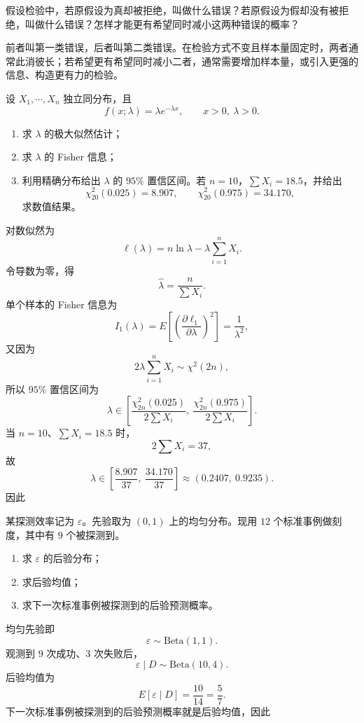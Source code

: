 ﻿

\begin{question}
假设检验中，若原假设为真却被拒绝，叫做什么错误？若原假设为假却没有被拒绝，叫做什么错误？怎样才能更有希望同时减小这两种错误的概率？
\begin{solution}
前者叫第一类错误，后者叫第二类错误。在检验方式不变且样本量固定时，两者通常此消彼长；若希望更有希望同时减小二者，通常需要增加样本量，或引入更强的信息、构造更有力的检验。
\end{solution}
\end{question}

\begin{question}
设 $X_1,\cdots,X_n$ 独立同分布，且
\[
f(x;\lambda)=\lambda e^{-\lambda x},\qquad x>0,\ \lambda>0.
\]
\begin{enumerate}
\item 求 $\lambda$ 的极大似然估计；
\item 求 $\lambda$ 的 Fisher 信息；
\item 利用精确分布给出 $\lambda$ 的 $95\%$ 置信区间。若 $n=10$，$\sum X_i=18.5$，并给出
\[
\chi^2_{20}(0.025)=8.907,\qquad \chi^2_{20}(0.975)=34.170,
\]
求数值结果。
\end{enumerate}
\begin{solution}
对数似然为
\[
\ell(\lambda)=n\ln\lambda-\lambda\sum_{i=1}^n X_i.
\]
令导数为零，得
\[
\hat\lambda=\frac{n}{\sum X_i}.
\]
单个样本的 Fisher 信息为
\[
I_1(\lambda)=E\left[\left(\frac{\partial \ell_1}{\partial\lambda}\right)^2\right]=\frac{1}{\lambda^2},
\]
又因为
\[
2\lambda\sum_{i=1}^n X_i\sim \chi^2(2n),
\]
所以 $95\%$ 置信区间为
\[
\lambda\in \left[\frac{\chi^2_{2n}(0.025)}{2\sum X_i},\ \frac{\chi^2_{2n}(0.975)}{2\sum X_i}\right].
\]
当 $n=10$、$\sum X_i=18.5$ 时，
\[
2\sum X_i=37,
\]
故
\[
\lambda\in \left[\frac{8.907}{37},\ \frac{34.170}{37}\right]
\approx (0.2407,\ 0.9235).
\]
因此
\end{solution}
\end{question}

\begin{question}
某探测效率记为 $\varepsilon$。先验取为 $(0,1)$ 上的均匀分布。现用 $12$ 个标准事例做刻度，其中有 $9$ 个被探测到。
\begin{enumerate}
\item 求 $\varepsilon$ 的后验分布；
\item 求后验均值；
\item 求下一次标准事例被探测到的后验预测概率。
\end{enumerate}
\begin{solution}
均匀先验即
\[
\varepsilon\sim \mathrm{Beta}(1,1).
\]
观测到 $9$ 次成功、$3$ 次失败后，
\[
\varepsilon\mid D\sim \mathrm{Beta}(10,4).
\]
后验均值为
\[
E[\varepsilon\mid D]=\frac{10}{14}=\frac57.
\]
下一次标准事例被探测到的后验预测概率就是后验均值，因此
\end{solution}
\end{question}

